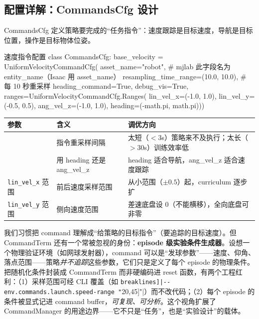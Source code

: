 \subsection{配置详解：CommandsCfg 设计}
\label{sec:rlmc-diy-events-cmd}

CommandsCfg 定义策略要完成的“任务指令”：速度跟踪是目标速度，导航是目标位置，操作是目标物体位姿。

\begin{codebox}[Python]{速度指令配置}
class CommandsCfg:
    base_velocity = UniformVelocityCommandCfg(
        asset_name="robot",                   # mjlab 此字段名为 entity_name（Isaac 用 asset_name）
        resampling_time_range=(10.0, 10.0),   # 每 10 秒重采样
        heading_command=True, debug_vis=True,
        ranges=UniformVelocityCommandCfg.Ranges(
            lin_vel_x=(-1.0, 1.0), lin_vel_y=(-0.5, 0.5),
            ang_vel_z=(-1.0, 1.0), heading=(-math.pi, math.pi)))
\end{codebox}

\begin{center}
\small
\begin{tabular}{@{}lp{4.0cm}p{5.0cm}@{}}
\toprule
参数 & 含义 & 调优方向 \\
\midrule
\Verb[breaklines]|resampling_time_range| & 指令重采样间隔 & 太短（$<3$s）策略来不及执行；太长（$>30$s）训练效率低 \\
\Verb[breaklines]|heading_command| & 用 heading 还是 ang\_vel\_z & heading 适合导航，ang\_vel\_z 适合速度跟踪 \\
\verb|lin_vel_x| 范围 & 前后速度采样范围 & 从小范围（$\pm 0.5$）起，curriculum 逐步扩 \\
\verb|lin_vel_y| 范围 & 侧向速度范围 & 差速底盘设 0（不能横移），全向底盘可非零 \\
\bottomrule
\end{tabular}
\end{center}

\begin{insight}\label{ins:rlmc-diy-command}
我们习惯把 command 理解成“给策略的目标指令”（要追踪的目标速度）。但 CommandTerm 还有一个常被忽视的身份：\textbf{episode 级实验条件生成器}。设想一个物理验证环境（如网球发射器），command 可以是“发球参数”——速度、仰角、落点范围——策略\emph{并不追踪}这些参数，它们只是定义了每个 episode 的物理条件。把随机化条件封装成 CommandTerm 而非硬编码进 reset 函数，有两个工程红利：（1）采样范围可经 CLI 覆盖（如 \Verb[breaklines]|--env.commands.launch.speed-range "[20,45]"|）而不改代码；（2）每个 episode 的条件被显式记进 command buffer，\emph{可复现、可分析}。这个视角扩展了 CommandManager 的用途边界——它不只是“任务”，也是“实验设计”的载体。
\end{insight}

